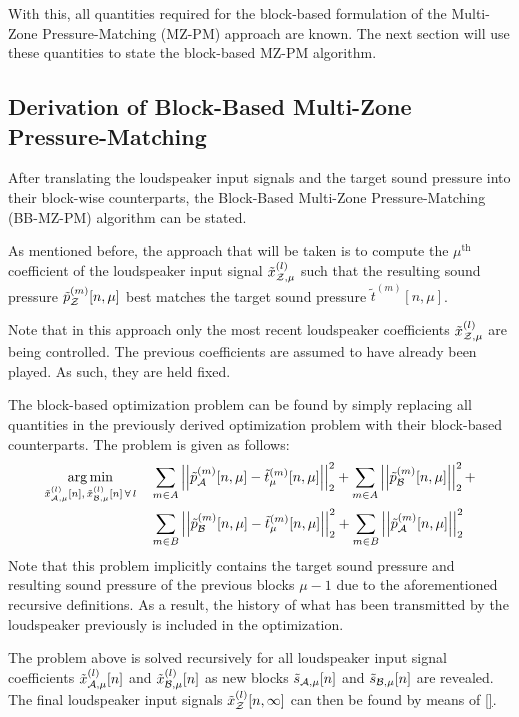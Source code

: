 With this,  all quantities required for the block-based formulation of the Multi-Zone Pressure-Matching (MZ-PM) approach are known.
The next section will use these quantities to state the block-based MZ-PM algorithm.

\subsection{Derivation of Block-Based Multi-Zone Pressure-Matching}
After translating the loudspeaker input signals and the target sound pressure into their block-wise counterparts, 
the Block-Based Multi-Zone Pressure-Matching (BB-MZ-PM) algorithm can be stated.

As mentioned before, the approach that will be taken is to compute the $\mu^\text{th}$ coefficient of the loudspeaker input signal
$\tilde{x}^{(l)}_{\mathcal{Z},\mu}$ such that the resulting sound pressure $\tilde{p}_{\mathcal{Z}}^{(m)}[n, \mu]$ best matches the target sound pressure 
$\tilde{t}^{(m)}[n, \mu]$. 

Note that in this approach only the most recent loudspeaker coefficients $\tilde{x}^{(l)}_{\mathcal{Z},\mu}$ are being controlled. 
The previous coefficients are assumed to have already been played.
As such, they are held fixed.

The block-based optimization problem can be found by simply replacing all quantities in the previously derived optimization problem
with their block-based counterparts.
The problem is given as follows:
\begin{align}
    \argmin{\tilde{x}_{\za,\mu}^{(l)}[n],\,\tilde{x}_{\zb,\mu}^{(l)}[n]\,\forall\,l}{
       &\sum_{m\in A} \norm[2][2]{\tilde{p}_{\za}^{(m)}[n,\mu] - \tilde{t}_\mu^{(m)}[n,\mu]} +
       \sum_{m\in A} \norm[2][2]{\tilde{p}_{\zb}^{(m)}[n,\mu]} + \\
       &\sum_{m\in B} \norm[2][2]{\tilde{p}_{\zb}^{(m)}[n,\mu] - \tilde{t}_\mu^{(m)}[n,\mu]} + 
       \sum_{m\in B} \norm[2][2]{\tilde{p}_{\za}^{(m)}[n,\mu]}
    }
\end{align}
Note that this problem implicitly contains the target sound pressure and resulting sound pressure of the previous blocks $\mu - 1$ due to
the aforementioned recursive definitions.
As a result, the history of what has been transmitted by the loudspeaker previously is included in the optimization.

The problem above is solved recursively for all loudspeaker input signal coefficients $\tilde{x}_{\mathcal{A},\mu}^{(l)}[n]$ and $\tilde{x}_{\mathcal{B},\mu}^{(l)}[n]$
as new blocks $\tilde{s}_{\mathcal{A},\mu}[n]$ and $\tilde{s}_{\mathcal{B},\mu}[n]$ are revealed.
The final loudspeaker input signals $\tilde{x}_{\mathcal{Z}}^{(l)}[n, \infty]$  can then be found by means of \autoref{}.

